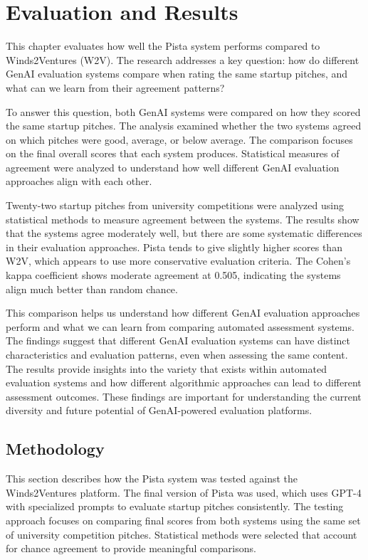 \chapter{Evaluation and Results}
\label{ch:evaluation}

This chapter evaluates how well the Pista system performs compared to Winds2Ventures (W2V). The research addresses a key question: how do different GenAI evaluation systems compare when rating the same startup pitches, and what can we learn from their agreement patterns?

To answer this question, both GenAI systems were compared on how they scored the same startup pitches. The analysis examined whether the two systems agreed on which pitches were good, average, or below average. The comparison focuses on the final overall scores that each system produces. Statistical measures of agreement were analyzed to understand how well different GenAI evaluation approaches align with each other.

Twenty-two startup pitches from university competitions were analyzed using statistical methods to measure agreement between the systems. The results show that the systems agree moderately well, but there are some systematic differences in their evaluation approaches. Pista tends to give slightly higher scores than W2V, which appears to use more conservative evaluation criteria. The Cohen's kappa coefficient shows moderate agreement at 0.505, indicating the systems align much better than random chance.

This comparison helps us understand how different GenAI evaluation approaches perform and what we can learn from comparing automated assessment systems. The findings suggest that different GenAI evaluation systems can have distinct characteristics and evaluation patterns, even when assessing the same content. The results provide insights into the variety that exists within automated evaluation systems and how different algorithmic approaches can lead to different assessment outcomes. These findings are important for understanding the current diversity and future potential of GenAI-powered evaluation platforms.

\section{Methodology}
\label{sec:methodology}

This section describes how the Pista system was tested against the Winds2Ventures platform. The final version of Pista was used, which uses GPT-4 with specialized prompts to evaluate startup pitches consistently. The testing approach focuses on comparing final scores from both systems using the same set of university competition pitches. Statistical methods were selected that account for chance agreement to provide meaningful comparisons.

